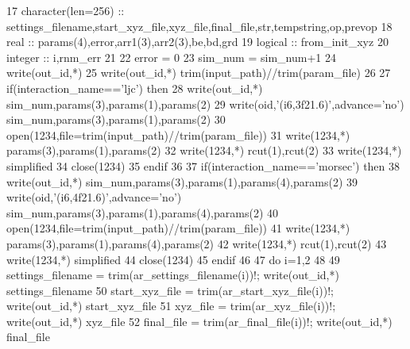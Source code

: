 \begin{DoxyCode}
17 \textcolor{comment}{character(len=256)      ::  settings\_filename,start\_xyz\_file,xyz\_file,final\_file,str,tempstring,op,prevop}
18 \textcolor{keywordtype}{real}                    ::  params(4),error,arr1(3),arr2(3),be,bd,grd
19 logical                 ::  from\_init\_xyz
20 integer                 ::  i,rnm\_err
21 
22     error = 0
23     sim\_num = sim\_num+1
24     \textcolor{keyword}{write}(out\_id,*)
25     \textcolor{keyword}{write}(out\_id,*) trim(input\_path)//trim(param\_file)
26 
27     \textcolor{keywordflow}{if}(interaction\_name==\textcolor{stringliteral}{'ljc'}) \textcolor{keywordflow}{then}
28         \textcolor{keyword}{write}(out\_id,*) sim\_num,params(3),params(1),params(2)
29         \textcolor{keyword}{write}(oid,\textcolor{stringliteral}{'(i6,3f21.6)'},advance=\textcolor{stringliteral}{'no'}) sim\_num,params(3),params(1),params\textcolor{comment}{(2)}
30 \textcolor{comment}{        }\textcolor{keyword}{open}(1234,file=trim(input\_path)//trim(param\_file))
31         \textcolor{keyword}{write}(1234,*) params(3),params(1),params(2)
32         \textcolor{keyword}{write}(1234,*) rcut(1),rcut(2)
33         \textcolor{keyword}{write}(1234,*) simplified
34         \textcolor{keyword}{close}(1234)
35 \textcolor{keywordflow}{    endif}
36 
37     \textcolor{keywordflow}{if}(interaction\_name==\textcolor{stringliteral}{'morsec'}) \textcolor{keywordflow}{then}
38         \textcolor{keyword}{write}(out\_id,*) sim\_num,params(3),params(1),params(4),params(2)
39         \textcolor{keyword}{write}(oid,\textcolor{stringliteral}{'(i6,4f21.6)'},advance=\textcolor{stringliteral}{'no'}) sim\_num,params(3),params(1),params\textcolor{comment}{(4),params(2)}
40 \textcolor{comment}{        }\textcolor{keyword}{open}(1234,file=trim(input\_path)//trim(param\_file))
41         \textcolor{keyword}{write}(1234,*) params(3),params(1),params(4),params(2)
42         \textcolor{keyword}{write}(1234,*) rcut(1),rcut(2)
43         \textcolor{keyword}{write}(1234,*) simplified
44         \textcolor{keyword}{close}(1234)
45 \textcolor{keywordflow}{    endif}
46 
47     \textcolor{keywordflow}{do} i=1,2
48 
49         settings\_filename = trim(ar\_settings\_filename(i))\textcolor{comment}{!; write(out\_id,*) settings\_filename}
50         start\_xyz\_file = trim(ar\_start\_xyz\_file(i))\textcolor{comment}{!;       write(out\_id,*) start\_xyz\_file}
51         xyz\_file = trim(ar\_xyz\_file(i))\textcolor{comment}{!;                   write(out\_id,*) xyz\_file}
52         final\_file = trim(ar\_final\_file(i))\textcolor{comment}{!;               write(out\_id,*) final\_file}

\end{DoxyCode}
